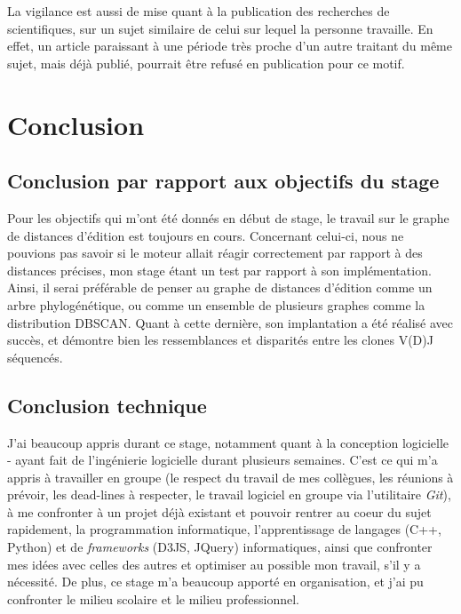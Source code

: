 \documentclass[pdftex,12pt,a4paper]{report}
\begin{document}
\begin{spacing}{1.2}
La vigilance est aussi de mise quant à la publication des recherches de scientifiques, sur un sujet similaire de celui sur lequel la personne travaille. En effet, un article paraissant à une période très proche d'un autre traitant du même sujet, mais déjà publié, pourrait être refusé en publication pour ce motif.

\chapter*{Conclusion}


\section*{Conclusion par rapport aux objectifs du stage}

Pour les objectifs qui m'ont été donnés en début de stage, le travail sur le graphe de distances d'édition est toujours en cours. Concernant celui-ci, nous ne pouvions pas savoir si le moteur allait réagir correctement par rapport à des distances précises, mon stage étant un test par rapport à son implémentation. Ainsi, il serai préférable de penser au graphe de distances d'édition comme un arbre phylogénétique, ou comme un ensemble de plusieurs graphes comme la distribution DBSCAN. Quant à cette dernière, son implantation a été réalisé avec succès, et démontre bien les ressemblances et disparités entre les clones V(D)J séquencés.

\section*{Conclusion technique}

J'ai beaucoup appris durant ce stage, notamment quant à la conception logicielle - ayant fait de l'ingénierie logicielle durant plusieurs semaines. C'est ce qui m'a appris à travailler en groupe (le respect du travail de mes collègues, les réunions à prévoir, les dead-lines à respecter, le travail logiciel en groupe via l'utilitaire \textit{Git}), à me confronter à un projet déjà existant et pouvoir rentrer au coeur du sujet rapidement, la programmation informatique, l'apprentissage de langages (C++, Python) et de \textit{frameworks} (D3JS, JQuery) informatiques, ainsi que confronter mes idées avec celles des autres et optimiser au possible mon travail, s'il y a nécessité. De plus, ce stage m'a beaucoup apporté en organisation, et j'ai pu confronter le milieu scolaire et le milieu professionnel.


\end{spacing}
\end{document}
